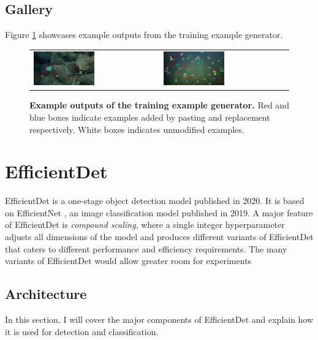 \documentclass[12pt,a4paper,twoside,openany]{report}
\begin{document}
\subsection{Gallery}

Figure \ref{Fig:exgen_gallary} showcases example outputs from the training example generator.

\begin{figure}[h!]
\begin{tabular}{ll}
\includegraphics[width=0.5\textwidth]{figs/implementation/exgen/1.png}&
\includegraphics[width=0.5\textwidth]{figs/implementation/exgen/2.png}
\end{tabular}
\caption{\textbf{Example outputs of the training example generator.} Red and blue boxes indicate examples added by pasting and replacement respectively. White boxes indicates unmodified examples.}
\label{Fig:exgen_gallary}
\end{figure}


\newpage
\section{EfficientDet}
EfficientDet \cite{tan_efficientdet_2020} is a one-stage object detection model published in 2020. It is based on EfficientNet \cite{tan_efficientnet_2020-1}, an image classification model published in 2019. 
A major feature of EfficientDet is \textit{compound scaling}, where a single integer hyperparameter adjusts all dimensions of the model and produces different variants of EfficientDet that caters to different performance and efficiency requirements. The many variants of EfficientDet would allow greater room for experiments

\subsection{Architecture}
In this section, I will cover the major components of EfficientDet and explain how it is used for detection and classification.
\end{document}
